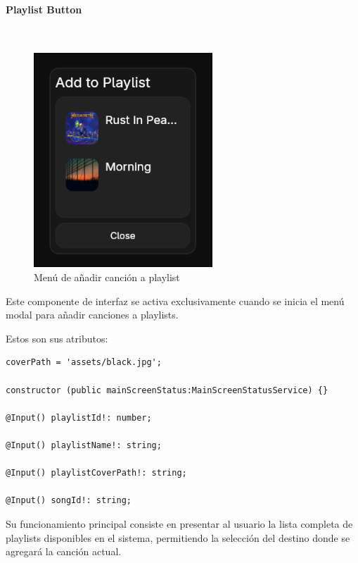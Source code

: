\documentclass[11pt, a4paper]{article}
\begin{document}
                \paragraph{Playlist Button}
                ‎

                \begin{figure}[H]
                    \centering
                    \includegraphics[width=0.6\textwidth]{media/screenshots/playlistbutton.png}
                    \caption{Menú de añadir canción a playlist}
                    \label{fig:añadir}
                \end{figure}

                Este componente de interfaz se activa exclusivamente cuando se inicia el menú modal para añadir canciones a playlists.

                Estos son sus atributos:

                \begin{lstlisting}[caption={Atributos Playlist Button}]
coverPath = 'assets/black.jpg';

constructor (public mainScreenStatus:MainScreenStatusService) {}

@Input() playlistId!: number;

@Input() playlistName!: string;

@Input() playlistCoverPath!: string;

@Input() songId!: string;
                \end{lstlisting}

                Su funcionamiento principal consiste en presentar al usuario la lista completa de playlists disponibles en el sistema, permitiendo la selección del destino donde se agregará la canción actual. \\
\end{document}

